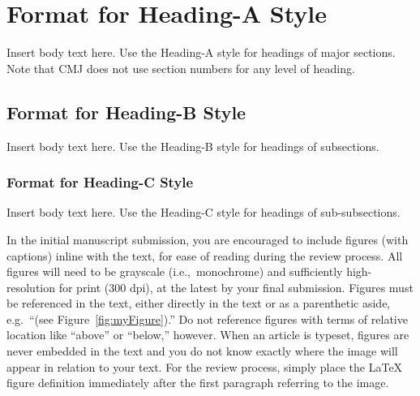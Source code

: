 \documentclass[letterpaper, 12pt]{article}
\begin{document}
\parskip 18pt

%
\section{Format for Heading-A Style}

Insert body text here.  
Use the Heading-A style for headings of major sections.
Note that CMJ does not use section numbers for any level of heading.

\vspace*{24pt}

\subsection{Format for Heading-B Style}

Insert body text here.  
Use the Heading-B style for headings of subsections.

\subsubsection{Format for Heading-C Style}

Insert body text here.
Use the Heading-C style for headings of sub-subsections.

In the initial manuscript submission, you are encouraged to include figures (with captions) inline with the text, for ease of reading during the review process. 
All figures will need to be grayscale (i.e.,~monochrome) and sufficiently high-resolution for print (300 dpi), at the latest by your final submission.
Figures must be referenced in the text, either directly in the text or as a parenthetic aside, e.g.~``(see Figure~\ref{fig:myFigure}).''
Do not reference figures with terms of relative location like ``above'' or ``below,'' however.
When an article is typeset, figures are never embedded in the text and you do not know exactly where the image will appear in relation to your text.
For the review process, simply place the LaTeX figure definition immediately after the first paragraph referring to the image.
\end{document}

